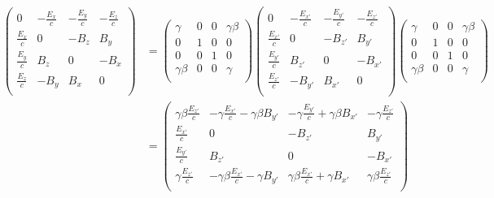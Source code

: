 \documentclass[a4paper,10pt]{article}
\begin{document}
\begin{subequations}
\begin{align}
\begin{pmatrix}
		0					&	-\frac{E_x}{c}	&	-\frac{E_y}{c}	&	-\frac{E_z}{c}	\\
		\frac{E_x}{c}	&	0						&	-B_z					&	B_y					\\
		\frac{E_y}{c}	&	B_z					&	0						&	-B_x					\\
		\frac{E_z}{c}	&	-B_y					&	B_x					&	0						\\
\end{pmatrix}
&=
\begin{pmatrix}
		\gamma			&	0	&	0	&	\gamma\beta	\\
		0						&	1	&	0	&	0						\\
		0						&	0	&	1	&	0						\\
		\gamma\beta	&	0	&	0	&	\gamma			\\
\end{pmatrix}
\begin{pmatrix}
		0						&	-\frac{E_{x'}}{c}	&	-\frac{E_{y'}}{c}	&	-\frac{E_{z'}}{c}	\\
		\frac{E_{x'}}{c}	&	0						&	-B_{z'}				&	B_{y'}				\\
		\frac{E_{y'}}{c}	&	B_{z'}				&	0						&	-B_{x'}				\\
		\frac{E_{z'}}{c}	& 	-B_{y'}				&	B_{x'}				&	0						\\
\end{pmatrix}
\begin{pmatrix}
		\gamma			&	0	&	0	&	\gamma\beta	\\
		0						&	1	&	0	&	0						\\
		0						&	0	&	1	&	0						\\
		\gamma\beta	&	0	&	0	&	\gamma			\\
\end{pmatrix}	\\
&=
\begin{pmatrix}
		\gamma\beta\frac{E_{z'}}{c}	&	-\gamma\frac{E_{x'}}{c}-\gamma\beta B_{y'}	&	-\gamma\frac{E_{y'}}{c}+\gamma\beta B_{x'}	&	-\gamma\frac{E_{z'}}{c}	\\
		\frac{E_{x'}}{c}						&	0																		&	-B_{z'}																&	B_{y'}				\\
		\frac{E_{y'}}{c}						&	B_{z'}																&	0																		&	-B_{x'}				\\
		\gamma\frac{E_{z'}}{c}			& 	-\gamma\beta\frac{E_{x'}}{c}- \gamma B_{y'}	&	\gamma\beta\frac{E_{x'}}{c}+\gamma B_{x'}	&	\gamma\beta\frac{E_{z'}}{c}	\\

\end{pmatrix}
\end{align}
\end{subequations}
\end{document}

